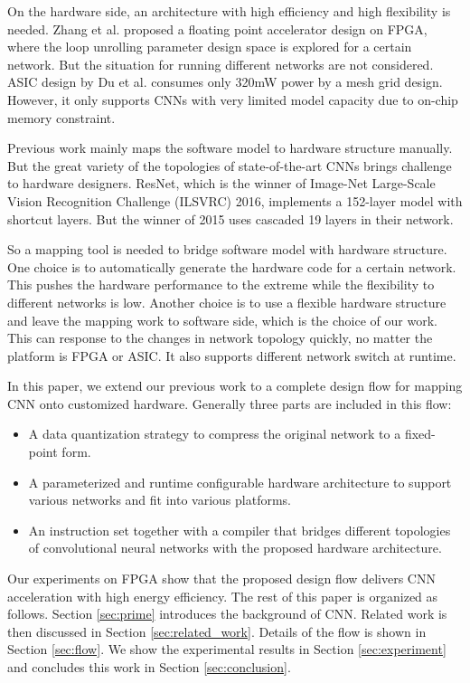 \documentclass[10pt, conference, compsocconf]{IEEEtran}
\begin{document}
On the hardware side, an architecture with high efficiency and high flexibility is needed. Zhang et al.\cite{zhang2015optimizing} proposed a floating point accelerator design on FPGA, where the loop unrolling parameter design space is explored for a certain network. But the situation for running different networks are not considered. ASIC design by Du et al.\cite{du2015shidiannao} consumes only 320mW power by a mesh grid design. However, it only supports CNNs with very limited model capacity due to on-chip memory constraint.

Previous work mainly maps the software model to hardware structure manually. But the great variety of the topologies of state-of-the-art CNNs brings challenge to hardware designers. ResNet\cite{he2015deep}, which is the winner of Image-Net Large-Scale Vision Recognition Challenge (ILSVRC) 2016, implements a 152-layer model with shortcut layers. But the winner of 2015 \cite{simonyan2014very} uses cascaded 19 layers in their network.

So a mapping tool is needed to bridge software model with hardware structure. One choice is to automatically generate the hardware code for a certain network. This pushes the hardware performance to the extreme while the flexibility to different networks is low. Another choice is to use a flexible hardware structure and leave the mapping work to software side, which is the choice of our work. This can response to the changes in network topology quickly, no matter the platform is FPGA or ASIC. It also supports different network switch at runtime.

In this paper, we extend our previous work\cite{qiu2016going} to a complete design flow for mapping CNN onto customized hardware. Generally three parts are included in this flow:
\begin{itemize} %
    \item A data quantization strategy to compress the original network to a fixed-point form.
    \item A parameterized and runtime configurable hardware architecture to support various networks and fit into various platforms.
    \item An instruction set together with a compiler that bridges different topologies of convolutional neural networks with the proposed hardware architecture.
\end{itemize}
Our experiments on FPGA show that the proposed design flow delivers CNN acceleration with high energy efficiency. The rest of this paper is organized as follows. Section \ref{sec:prime} introduces the background of CNN. Related work is then discussed in Section \ref{sec:related_work}. Details of the flow is shown in Section \ref{sec:flow}. We show the experimental results in Section \ref{sec:experiment} and concludes this work in Section \ref{sec:conclusion}.
\end{document}
